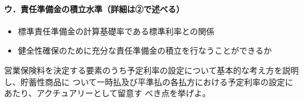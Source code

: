 \documentclass[report,gutter=10mm,fore-edge=10mm,uplatex,dvipdfmx]{jlreq}
\begin{document}
\paragraph{ウ．責任準備金の積立水準（詳細は②で述べる）}
\begin{itemize}
 \item 標準責任準備金の計算基礎率である標準利率との関係
 \item 健全性確保のために充分な責任準備金の積立を行なうことができるか
\end{itemize}

営業保険料を決定する要素のうち予定利率の設定について基本的な考え方を説明し、貯蓄性商品に
ついて一時払及び平準払の各払方における予定利率の設定にあたり、アクチュアリーとして留意す
べき点を挙げよ。

\end{document}
